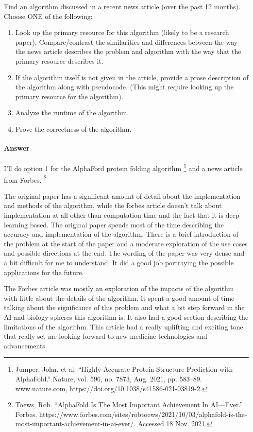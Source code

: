 \documentclass{article}
\begin{document}
\collab{}

Find an algorithm discussed in a recent news article (over the past 12 months).
Choose ONE of the following:
\begin{enumerate}
    \item Look up the primary resource for this algorithm (likely to be a
        research paper).  Compare/contrast the similarities and differences between the
        way the news article describes the problem and algorithm with the way
        that the primary resource describes it.
    \item If the algorithm itself is not given in the article, provide a prose
        description of the algorithm along with pseudocode. (This might require
        looking up the primary resource for the algorithm).
    \item Analyze the runtime of the algorithm.
    \item Prove the correctness of the algorithm.
\end{enumerate}

\paragraph{Answer} I'll do option 1 for the AlphaFord protein folding algorithm \footnote{Jumper, John, et al. “Highly Accurate Protein Structure Prediction with AlphaFold.” Nature, vol. 596, no. 7873, Aug. 2021, pp. 583–89. www.nature.com, https://doi.org/10.1038/s41586-021-03819-2.} and a news article from Forbes. \footnote{Toews, Rob. “AlphaFold Is The Most Important Achievement In AI—Ever.” Forbes, https://www.forbes.com/sites/robtoews/2021/10/03/alphafold-is-the-most-important-achievement-in-ai-ever/. Accessed 18 Nov. 2021.}

The original paper has a significant amount of detail about the implementation and methods of the algorithm, while the forbes article doesn't talk about implementation at all other than computation time and the fact that it is deep learning based. The original paper spends most of the time describing the accuracy and implementation of the algorithm. There is a brief introduction of the problem at the start of the paper and a moderate exploration of the use cases and possible directions at the end. The wording of the paper was very dense and a bit difficult for me to understand. It did a good job portraying the possible applications for the future.

The Forbes article was mostly an exploration of the impacts of the algorithm with little about the details of the algorithm. It spent a good amount of time talking about the significance of this problem and what a bit step forward in the AI and biology spheres this algorithm is. It also had a good section describing the limitations of the algorithm. This article had a really uplifting and exciting tone that really set me looking forward to new medicine technologies and advancements.
\end{document}

